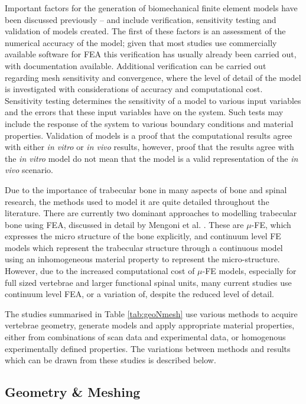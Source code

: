 Important factors for the generation of biomechanical finite element
models have been discussed previously \cite{Jones2008}--\cite{Viceconti2005}
and include
verification, sensitivity testing and validation of models created. The
first of these factors is an assessment of the numerical accuracy of
the model; given that most studies use commercially available software
for FEA this verification has usually already been carried out, with
documentation available. Additional verification can be carried out
regarding mesh sensitivity and convergence, where the level of detail of
the model is investigated with considerations of accuracy and
computational cost. Sensitivity testing determines the sensitivity of a
model to various input variables and the errors that these input
variables have on the system. Such tests may include the response of the
system to various boundary conditions and material properties.
Validation of models is a proof that the computational results agree
with either \emph{in vitro} or \emph{in vivo} results, however, proof
that the results agree with the \emph{in vitro} model do not mean that
the model is a valid representation of the \emph{in vivo} scenario.

Due to the importance of trabecular bone in many aspects of bone and
spinal research, the methods used to model it are quite detailed
throughout the literature. There are currently two dominant approaches
to modelling trabecular bone using FEA, discussed in detail by Mengoni
et al. \cite{Mengoni2014}. These are $\mu$-FE, which expresses the micro
structure
of
the bone explicitly, and continuum level FE models which represent the
trabecular structure through a continuous model using an inhomogeneous
material property to represent the micro-structure. However, due to the
increased computational cost of $\mu$-FE models, especially for full sized
vertebrae and larger functional spinal units, many current studies use
continuum level FEA, or a variation of, despite the reduced level of
detail.

The studies summarised in Table \ref{tab:geoNmesh} use various methods to
acquire
vertebrae geometry, generate models and apply appropriate material
properties, either from combinations of scan data and experimental data,
or homogenous experimentally defined properties. The variations between
methods and results which can be drawn from these studies is described
below.

\subsection{Geometry \& Meshing}\label{geometry-meshing}

